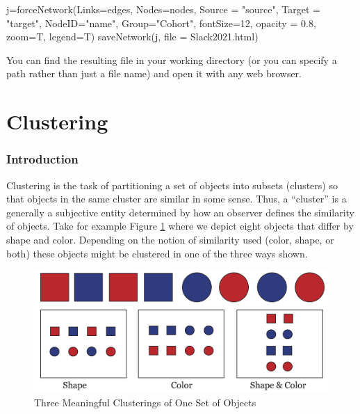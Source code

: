 \documentclass[
]{article}
\newenvironment{Shaded}{\begin{snugshade}}{\end{snugshade}}
\newcommand{\AttributeTok}[1]{\textcolor[rgb]{0.77,0.63,0.00}{#1}}
\newcommand{\DecValTok}[1]{\textcolor[rgb]{0.00,0.00,0.81}{#1}}
\newcommand{\FloatTok}[1]{\textcolor[rgb]{0.00,0.00,0.81}{#1}}
\newcommand{\FunctionTok}[1]{\textcolor[rgb]{0.00,0.00,0.00}{#1}}
\newcommand{\NormalTok}[1]{#1}
\newcommand{\OtherTok}[1]{\textcolor[rgb]{0.56,0.35,0.01}{#1}}
\newcommand{\StringTok}[1]{\textcolor[rgb]{0.31,0.60,0.02}{#1}}
\theoremstyle{definition}
\theoremstyle{definition}
\theoremstyle{definition}
\theoremstyle{definition}
\theoremstyle{remark}
\begin{document}
\begin{Shaded}
\begin{Highlighting}[]
\NormalTok{j}\OtherTok{=}\FunctionTok{forceNetwork}\NormalTok{(}\AttributeTok{Links=}\NormalTok{edges, }\AttributeTok{Nodes=}\NormalTok{nodes, }\AttributeTok{Source =} \StringTok{"source"}\NormalTok{,}
               \AttributeTok{Target =} \StringTok{"target"}\NormalTok{, }\AttributeTok{NodeID=}\StringTok{"name"}\NormalTok{, }\AttributeTok{Group=}\StringTok{"Cohort"}\NormalTok{,}
               \AttributeTok{fontSize=}\DecValTok{12}\NormalTok{, }\AttributeTok{opacity =} \FloatTok{0.8}\NormalTok{, }\AttributeTok{zoom=}\NormalTok{T, }\AttributeTok{legend=}\NormalTok{T)}
\FunctionTok{saveNetwork}\NormalTok{(j, }\AttributeTok{file =} \StringTok{\textquotesingle{}Slack2021.html\textquotesingle{}}\NormalTok{)}
\end{Highlighting}
\end{Shaded}

You can find the resulting file in your working directory (or you can specify a path rather than just a file name) and open it with any web browser.

\hypertarget{part-clustering}{%
\part{Clustering}\label{part-clustering}}

\hypertarget{clusintro}{%
\section{Introduction}\label{clusintro}}

Clustering is the task of partitioning a set of objects into subsets (clusters) so that objects in the same cluster are similar in some sense. Thus, a ``cluster'' is a generally a subjective entity determined by how an observer defines the similarity of objects. Take for example Figure \ref{fig:shapes} where we depict eight objects that differ by shape and color. Depending on the notion of similarity used (color, shape, or both) these objects might be clustered in one of the three ways shown.

\begin{figure}

{\centering \includegraphics[width=0.75\linewidth]{figs/shapes} 

}

\caption{Three Meaningful Clusterings of One Set of Objects}\label{fig:shapes}
\end{figure}
\end{document}
